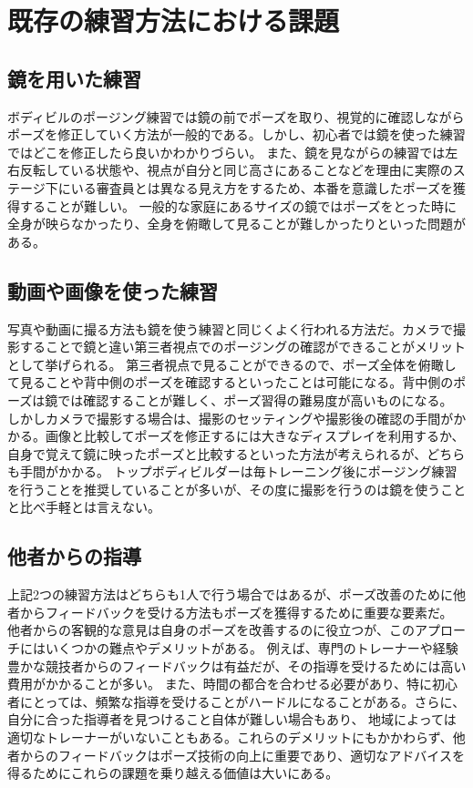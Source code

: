 \section{既存の練習方法における課題}
\subsection{鏡を用いた練習}
ボディビルのポージング練習では鏡の前でポーズを取り、視覚的に確認しながらポーズを修正していく方法が一般的である。しかし、初心者では鏡を使った練習ではどこを修正したら良いかわかりづらい。
また、鏡を見ながらの練習では左右反転している状態や、視点が自分と同じ高さにあることなどを理由に実際のステージ下にいる審査員とは異なる見え方をするため、本番を意識したポーズを獲得することが難しい。
一般的な家庭にあるサイズの鏡ではポーズをとった時に全身が映らなかったり、全身を俯瞰して見ることが難しかったりといった問題がある。
\subsection{動画や画像を使った練習}
写真や動画に撮る方法も鏡を使う練習と同じくよく行われる方法だ。カメラで撮影することで鏡と違い第三者視点でのポージングの確認ができることがメリットとして挙げられる。
第三者視点で見ることができるので、ポーズ全体を俯瞰して見ることや背中側のポーズを確認するといったことは可能になる。背中側のポーズは鏡では確認することが難しく、ポーズ習得の難易度が高いものになる。
しかしカメラで撮影する場合は、撮影のセッティングや撮影後の確認の手間がかかる。画像と比較してポーズを修正するには大きなディスプレイを利用するか、自身で覚えて鏡に映ったポーズと比較するといった方法が考えられるが、どちらも手間がかかる。
トップボディビルダーは毎トレーニング後にポージング練習を行うことを推奨していることが多いが、その度に撮影を行うのは鏡を使うことと比べ手軽とは言えない。
\subsection{他者からの指導}
上記2つの練習方法はどちらも1人で行う場合ではあるが、ポーズ改善のために他者からフィードバックを受ける方法もポーズを獲得するために重要な要素だ。
他者からの客観的な意見は自身のポーズを改善するのに役立つが、このアプローチにはいくつかの難点やデメリットがある。
例えば、専門のトレーナーや経験豊かな競技者からのフィードバックは有益だが、その指導を受けるためには高い費用がかかることが多い。
また、時間の都合を合わせる必要があり、特に初心者にとっては、頻繁な指導を受けることがハードルになることがある。さらに、自分に合った指導者を見つけること自体が難しい場合もあり、
地域によっては適切なトレーナーがいないこともある。これらのデメリットにもかかわらず、他者からのフィードバックはポーズ技術の向上に重要であり、適切なアドバイスを得るためにこれらの課題を乗り越える価値は大いにある。

